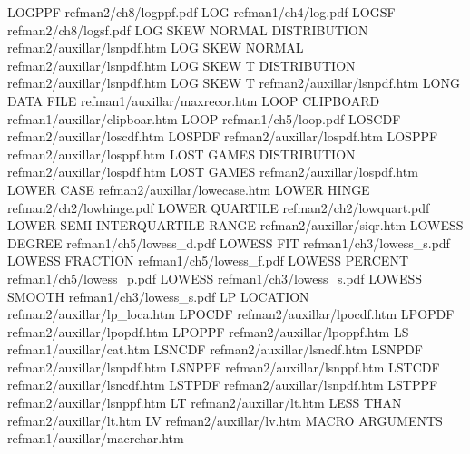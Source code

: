 LOGPPF                                  refman2/ch8/logppf.pdf
LOG                                     refman1/ch4/log.pdf
LOGSF                                   refman2/ch8/logsf.pdf
LOG SKEW NORMAL DISTRIBUTION            refman2/auxillar/lsnpdf.htm
LOG SKEW NORMAL                         refman2/auxillar/lsnpdf.htm
LOG SKEW T DISTRIBUTION                 refman2/auxillar/lsnpdf.htm
LOG SKEW T                              refman2/auxillar/lsnpdf.htm
LONG DATA FILE                          refman1/auxillar/maxrecor.htm
LOOP CLIPBOARD                          refman1/auxillar/clipboar.htm
LOOP                                    refman1/ch5/loop.pdf
LOSCDF                                  refman2/auxillar/loscdf.htm
LOSPDF                                  refman2/auxillar/lospdf.htm
LOSPPF                                  refman2/auxillar/losppf.htm
LOST GAMES DISTRIBUTION                 refman2/auxillar/lospdf.htm
LOST GAMES                              refman2/auxillar/lospdf.htm
LOWER CASE                              refman2/auxillar/lowecase.htm
LOWER HINGE                             refman2/ch2/lowhinge.pdf
LOWER QUARTILE                          refman2/ch2/lowquart.pdf
LOWER SEMI INTERQUARTILE RANGE          refman2/auxillar/siqr.htm
LOWESS DEGREE                           refman1/ch5/lowess_d.pdf
LOWESS FIT                              refman1/ch3/lowess_s.pdf
LOWESS FRACTION                         refman1/ch5/lowess_f.pdf
LOWESS PERCENT                          refman1/ch5/lowess_p.pdf
LOWESS                                  refman1/ch3/lowess_s.pdf
LOWESS SMOOTH                           refman1/ch3/lowess_s.pdf
LP LOCATION                             refman2/auxillar/lp_loca.htm
LPOCDF                                  refman2/auxillar/lpocdf.htm
LPOPDF                                  refman2/auxillar/lpopdf.htm
LPOPPF                                  refman2/auxillar/lpoppf.htm
LS                                      refman1/auxillar/cat.htm
LSNCDF                                  refman2/auxillar/lsncdf.htm
LSNPDF                                  refman2/auxillar/lsnpdf.htm
LSNPPF                                  refman2/auxillar/lsnppf.htm
LSTCDF                                  refman2/auxillar/lsncdf.htm
LSTPDF                                  refman2/auxillar/lsnpdf.htm
LSTPPF                                  refman2/auxillar/lsnppf.htm
LT                                      refman2/auxillar/lt.htm
LESS THAN                               refman2/auxillar/lt.htm
LV                                      refman2/auxillar/lv.htm
MACRO ARGUMENTS                         refman1/auxillar/macrchar.htm
